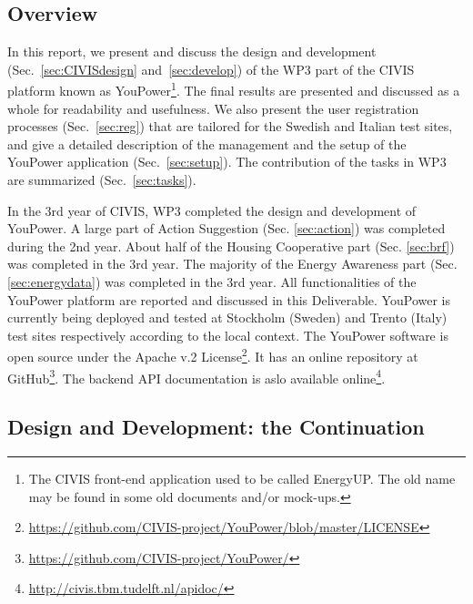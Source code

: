 \subsection{Overview}

In this report, we present and discuss the design and development (Sec.~\ref{sec:CIVISdesign} and~\ref{sec:develop}) of the WP3 part of the CIVIS platform known as YouPower\footnote{The CIVIS front-end application used to be called EnergyUP. The old name may be found in some old documents and/or mock-ups.}. 
The final results are presented and discussed as a whole for readability and usefulness. 
% 
We also present the user registration processes (Sec.~\ref{sec:reg}) that are tailored for the Swedish and Italian test sites, and give a detailed description of the management and the setup of the YouPower application (Sec.~\ref{sec:setup}). The contribution of the tasks in WP3 are summarized (Sec.~\ref{sec:tasks}).

In the 3rd year of CIVIS, WP3 completed the design and development of YouPower. A large part of Action Suggestion (Sec. \ref{sec:action}) was completed during the 2nd year. About half of the Housing Cooperative part (Sec. \ref{sec:brf}) was completed in the 3rd year. The majority of the Energy Awareness part (Sec. \ref{sec:energydata}) was completed in the 3rd year. 
All functionalities of the YouPower platform are reported and discussed in this Deliverable. YouPower is currently being deployed and tested at Stockholm (Sweden) and Trento (Italy) test sites respectively according to the local context. The YouPower software is open source under the Apache v.2 License\footnote{\url{https://github.com/CIVIS-project/YouPower/blob/master/LICENSE}}. It has  an online repository at GitHub\footnote{ \url{https://github.com/CIVIS-project/YouPower/}}. 
The backend API documentation is aslo available online\footnote{ \url{http://civis.tbm.tudelft.nl/apidoc/}}. 


\subsection{Design and Development: the Continuation}

